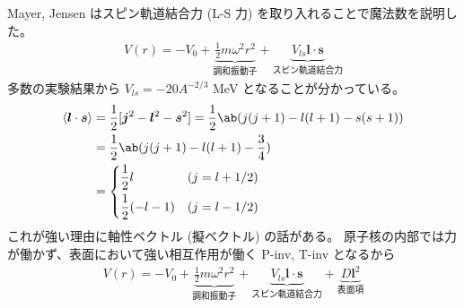\documentclass[uplatex,dvipdfmx,a4paper,11pt]{jlreq}
\numberwithin{equation}{section}
\theoremstyle{definition}
\begin{document}
Mayer, Jensen はスピン軌道結合力 (L-S 力) を取り入れることで魔法数を説明した。
\begin{align}
  V(r) = -V_0 + \underbrace{\frac{1}{2}m\omega^2r^2}_{調和振動⼦} + \underbrace{V_{ls}\bm{l}\cdot\bm{s}}_{スピン軌道結合力}
\end{align}
多数の実験結果から $V_{ls} = -20A^{-2/3}$ \si{MeV} となることが分かっている。
\begin{align}
  \langle \bm{l}\cdot\bm{s}\rangle & = \frac{1}{2}[\bm{j}^2 - \bm{l}^2 - \bm{s}^2] = \frac{1}{2}\ab(j(j + 1) - l(l + 1) - s(s + 1)) \\
                                   & = \frac{1}{2}\ab(j(j + 1) - l(l + 1) - \frac{3}{4})                                            \\
                                   & = \begin{dcases}
                                         \frac{1}{2}l         & (j = l + 1/2) \\
                                         \frac{1}{2}(- l - 1) & (j = l - 1/2) \\
                                       \end{dcases}
\end{align}
これが強い理由に軸性ベクトル (擬ベクトル) の話がある。
原子核の内部では力が働かず、表面において強い相互作用が働く P-inv, T-inv となるから
\begin{align}
  V(r) = -V_0 + \underbrace{\frac{1}{2}m\omega^2r^2}_{調和振動⼦} + \underbrace{V_{ls}\bm{l}\cdot\bm{s}}_{スピン軌道結合力} + \underbrace{D\bm{l}^2}_{表面項}
\end{align}
\end{document}
